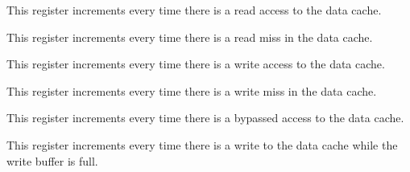 This register increments every time there is a read access to the data cache.

\debugCanWrite{}


This register increments every time there is a read miss in the data cache.

\debugCanWrite{}


This register increments every time there is a write access to the data cache.

\debugCanWrite{}


This register increments every time there is a write miss in the data cache.

\debugCanWrite{}


This register increments every time there is a bypassed access to the data cache.

\debugCanWrite{}


This register increments every time there is a write to the data cache while
the write buffer is full.

\debugCanWrite{}
